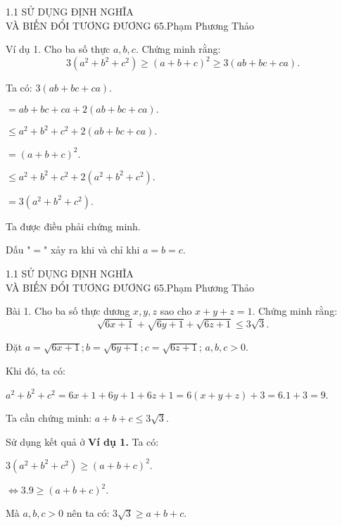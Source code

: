 \begin{frame}{1.1 SỬ DỤNG ĐỊNH NGHĨA \\ VÀ BIẾN ĐỔI TƯƠNG ĐƯƠNG \hspace{3cm}  65.Phạm Phương Thảo}
\begin{block}{Ví dụ 1.}
Cho ba số thực $a, b, c$. Chứng minh rằng: $$3(a^2+b^2+c^2) \geq (a+b+c)^2 \geq 3(ab+bc+ca).$$
\end{block}
\pause
Ta có: $3(ab+bc+ca).$

\pause

$=ab+bc+ca+2(ab+bc+ca).$

\pause
$\leq a^2+b^2+c^2+2(ab+bc+ca).$

$=(a+b+c)^2.$

\pause
$\leq a^2+b^2+c^2+2(a^2+b^2+c^2).$

$=3(a^2+b^2+c^2).$

Ta được điều phải chứng minh.

Dấu "$=$" xảy ra khi và chỉ khi $a=b=c$.
\end{frame}

\begin{frame}{1.1 SỬ DỤNG ĐỊNH NGHĨA \\ VÀ BIẾN ĐỔI TƯƠNG ĐƯƠNG \hspace{3cm}  65.Phạm Phương Thảo}
\begin{block}{Bài 1.}
Cho ba số thực dương $x, y, z$ sao cho $x+y+z=1$. Chứng minh rằng:
$$\sqrt{6x+1}+\sqrt{6y+1}+\sqrt{6z+1}\leq 3\sqrt{3}.$$
    
\end{block}
\pause
Đặt $a=\sqrt{6x+1}; b=\sqrt{6y+1}; c=\sqrt{6z+1}$; $a, b, c>0$.

\pause
Khi đó, ta có:

$a^2+b^2+c^2=6x+1+6y+1+6z+1=6(x+y+z)+3=6.1+3=9$.

\pause
Ta cần chứng minh: $a+b+c\leq 3\sqrt{3}$.

\pause
Sử dụng kết quả ở \textbf{Ví dụ 1.} Ta có:

$3(a^2+b^2+c^2) \geq (a+b+c)^2.$
\pause

$\Leftrightarrow 3.9 \geq (a+b+c)^2.$ 

Mà $a, b, c>0$ nên ta có: $3\sqrt{3}\geq a+b+c$.
\end{frame}
